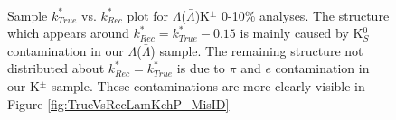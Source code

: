 \documentclass[../AnalysisNoteJBuxton.tex]{subfiles}
\begin{document}
\begin{figure}[h!]
  \centering
  \\
  \caption[Momentum Resolution: Sample $k^{*}_{True}$ vs. $k^{*}_{Rec}$]{Sample $k^{*}_{True}$ vs. $k^{*}_{Rec}$ plot for $\Lambda$($\bar{\Lambda}$)K$^{\pm}$ 0-10\% analyses.  The structure which appears around $k^{*}_{Rec} = k^{*}_{True}-0.15$ is mainly caused by K$^{0}_{S}$ contamination in our $\Lambda$($\bar{\Lambda}$) sample.  The remaining structure not distributed about $k^{*}_{Rec} = k^{*}_{True}$ is due to $\pi$ and $e$ contamination in our K$^{\pm}$ sample.  These contaminations are more clearly visible in Figure \ref{fig:TrueVsRecLamKchP_MisID}}
  \label{fig:TrueVsRecLamKchP}
\end{figure}
\end{document}
